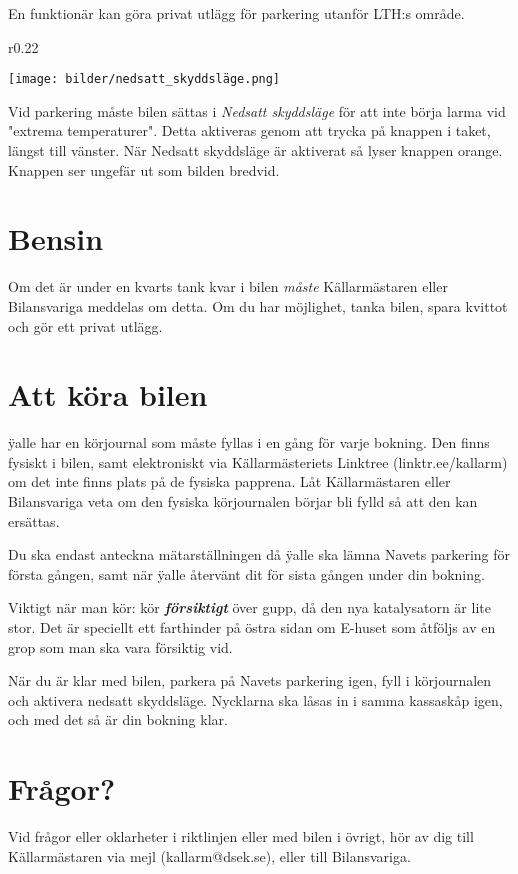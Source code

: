 \documentclass{dsekprotokoll}
\begin{document}
En funktionär kan göra privat utlägg för parkering utanför LTH:s område. 

\begin{wrapfigure}[3]{r}{0.22\textwidth}
    \raggedright
    \vspace{-0.6cm}
    \texttt{[image: bilder/nedsatt\_skyddsläge.png]}
\end{wrapfigure}

Vid parkering måste bilen sättas i \emph{Nedsatt skyddsläge} för att inte börja larma vid "extrema temperaturer". Detta aktiveras genom att trycka på knappen i taket, längst till vänster. När Nedsatt skyddsläge är aktiverat så lyser knappen orange. Knappen ser ungefär ut som bilden bredvid.

\section{Bensin} 
Om det är under en kvarts tank kvar i bilen \emph{måste} Källarmästaren eller Bilansvariga meddelas om detta. Om du har möjlighet, tanka bilen, spara kvittot och gör ett privat utlägg.

\section{Att köra bilen} 

\"yalle har en körjournal som måste fyllas i en gång för varje bokning. Den finns fysiskt i bilen, samt elektroniskt via Källarmästeriets Linktree (linktr.ee/kallarm) om det inte finns plats på de fysiska papprena. Låt Källarmästaren eller Bilansvariga veta om den fysiska körjournalen börjar bli fylld så att den kan ersättas. 

Du ska endast anteckna mätarställningen då \"yalle ska lämna Navets parkering för första gången, samt när \"yalle återvänt dit för sista gången under din bokning.

Viktigt när man kör: kör \emph{\textbf{försiktigt}} över gupp, då den nya katalysatorn är lite stor. Det är speciellt ett farthinder på östra sidan om E-huset som åtföljs av en grop som man ska vara försiktig vid. 

När du är klar med bilen, parkera på Navets parkering igen, fyll i körjournalen och aktivera nedsatt skyddsläge. Nycklarna ska låsas in i samma kassaskåp igen, och med det så är din bokning klar.


\section{Frågor?}
Vid frågor eller oklarheter i riktlinjen eller med bilen i övrigt, hör av dig till Källarmästaren via mejl (kallarm@dsek.se), eller till Bilansvariga.
\end{document}
